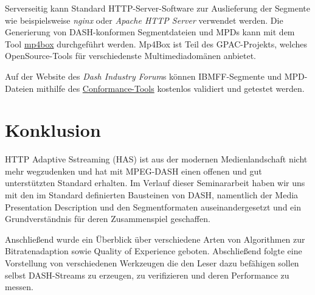 \documentclass[paper = a4, fontsize = 12pt, parskip = half]{scrartcl} %
\begin{document}
Serverseitig kann Standard HTTP-Server-Software zur Auslieferung der Segmente wie beispielsweise \textit{nginx} oder \textit{Apache HTTP Server} verwendet werden. Die Generierung von DASH-konformen Segmentdateien und MPDs kann mit dem Tool \hyperref{https://github.com/gpac/gpac}{}{}{mp4box} durchgeführt werden. Mp4Box ist Teil des GPAC-Projekts, welches OpenSource-Tools für verschiedenste Multimediadomänen anbietet.

Auf der Website des \textit{Dash Industry Forum}s können IBMFF-Segmente und MPD-Dateien mithilfe des \hyperref{https://conformance.dashif.org/}{}{}{Conformance-Tools} kostenlos validiert und getestet werden.

\section{Konklusion}
HTTP Adaptive Sstreaming (HAS) ist aus der modernen Medienlandschaft nicht mehr wegzudenken und hat mit MPEG-DASH einen offenen und gut unterstützten Standard erhalten. Im Verlauf dieser Seminararbeit haben wir uns mit den im Standard definierten Bausteinen von DASH, namentlich der Media Presentation Description und den Segmentformaten auseinandergesetzt und ein Grundverständnis für deren Zusammenspiel geschaffen.

Anschließend wurde ein Überblick über verschiedene Arten von Algorithmen zur Bitratenadaption sowie Quality of Experience geboten. Abschließend folgte eine Vorstellung von verschiedenen Werkzeugen die den Leser dazu befähigen sollen selbst DASH-Streams zu erzeugen, zu verifizieren und deren Performance zu messen.


\newpage
\printbibliography
\end{document}
